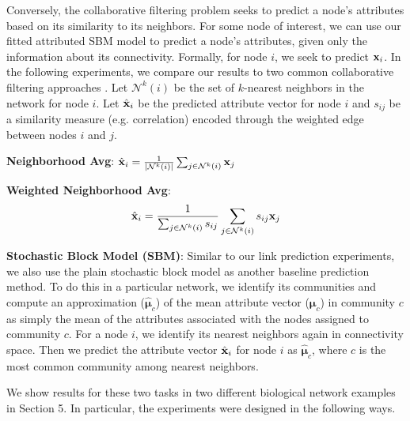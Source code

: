 Conversely, the collaborative filtering problem seeks to predict a node's attributes based on its similarity to its neighbors. For some node of interest, we can use our fitted attributed SBM model to predict a node's attributes, given only the information about its connectivity. Formally, for node $i$, we seek to predict ${\bf x}_{i}$. In the following experiments, we compare our results to two common collaborative filtering approaches \cite{collabFilterReview}. Let $\mathcal{N}^{k}(i)$ be the set of $k$-nearest neighbors in the network for node $i$. Let $\hat{{\bf x}}_{i}$ be the predicted attribute vector for node $i$ and $s_{ij}$ be a similarity measure (e.g. correlation) encoded through the weighted edge between nodes $i$ and $j$. 

{\bf Neighborhood Avg}: $\hat{{\bf x}}_{i}= \frac{1}{|\mathcal{N}^{k}(i)|}\sum_{j \in \mathcal{N}^{k}(i)} {\bf x}_{j}$

{\bf Weighted Neighborhood Avg}: \[\hat{{\bf x}}_{i}=\frac{1}{\sum_{j \in \mathcal{N}^{k}(i)}s_{ij}}\sum_{j \in \mathcal{N}^{k}(i)}s_{ij}{\bf x}_{j}\]

{\bf Stochastic Block Model (SBM)}: Similar to our link prediction experiments, we also use the plain stochastic block model as another baseline prediction method. To do this in a particular network, we identify its communities and compute an approximation ($\hat{\boldsymbol \mu}_{c}$) of the mean attribute vector (${\boldsymbol \mu}_{c}$) in community $c$ as simply the mean of the attributes associated with the nodes assigned to community $c$. For a node $i$, we identify its nearest neighbors again in connectivity space. Then we predict the attribute vector $\hat{\bf x}_{i}$ for node $i$ as 
$\hat{\boldsymbol \mu}_{c}$, where $c$ is the most common community among nearest neighbors. 

We show results for these two tasks in two different biological network examples in Section 5. In particular, the experiments were designed in the following ways.


